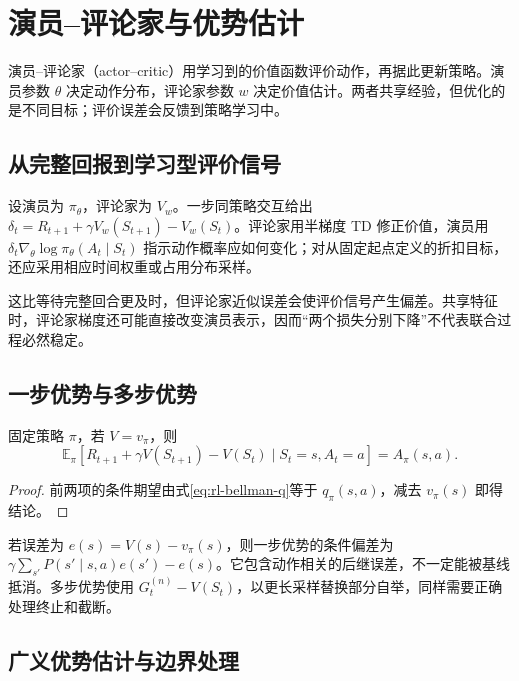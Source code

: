 \setcounter{chapter}{14} %
\chapter{演员--评论家与优势估计}
\label{ch:rl-actor-critic}

演员--评论家（actor--critic）用学习到的价值函数评价动作，再据此更新策略。演员参数 $\theta$ 决定动作分布，评论家参数 $w$ 决定价值估计。两者共享经验，但优化的是不同目标；评价误差会反馈到策略学习中。

\section{从完整回报到学习型评价信号}

设演员为 $\pi_\theta$，评论家为 $V_w$。一步同策略交互给出 $\delta_t=R_{t+1}+\gamma V_w(S_{t+1})-V_w(S_t)$。评论家用半梯度 TD 修正价值，演员用 $\delta_t\nabla_\theta\log\pi_\theta(A_t\mid S_t)$ 指示动作概率应如何变化；对从固定起点定义的折扣目标，还应采用相应时间权重或占用分布采样。

这比等待完整回合更及时，但评论家近似误差会使评价信号产生偏差。共享特征时，评论家梯度还可能直接改变演员表示，因而“两个损失分别下降”不代表联合过程必然稳定。

\section{一步优势与多步优势}

\begin{proposition}[精确价值下的 TD 优势]
固定策略 $\pi$，若 $V=v_\pi$，则
\[
\mathbb E_\pi[R_{t+1}+\gamma V(S_{t+1})-V(S_t)\mid S_t=s,A_t=a]=A_\pi(s,a).
\]
\end{proposition}
\begin{proof}
前两项的条件期望由式\eqref{eq:rl-bellman-q}等于 $q_\pi(s,a)$，减去 $v_\pi(s)$ 即得结论。
\end{proof}

若误差为 $e(s)=V(s)-v_\pi(s)$，则一步优势的条件偏差为 $\gamma\sum_{s'}P(s'\mid s,a)e(s')-e(s)$。它包含动作相关的后继误差，不一定能被基线抵消。多步优势使用 $G_t^{(n)}-V(S_t)$，以更长采样替换部分自举，同样需要正确处理终止和截断。

\section{广义优势估计与边界处理}

